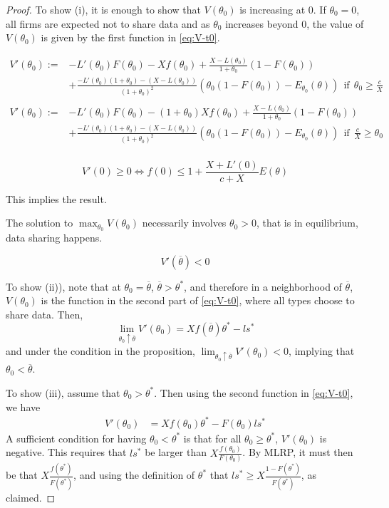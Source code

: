 \documentclass[a4paper]{article}
\renewcommand{\t}{\theta}
\begin{document}
\begin{proof}
  To show (i), it is enough to show that $V(\t_0)$ is increasing at $0$. If $\t_0=0$, all firms are expected not to share data and as $\theta_0$ increases beyond $0$, the value of $V(\t_0)$ is given by the first function in \eqref{eq:V-t0}. 
  
  
  \begin{equation}\label{eq:V-t0}
\begin{aligned}
  V'(\t_0):=&-L'(\t_0)F(\t_0)-X f(\t_0)+\frac{X-L(\t_0)}{1+\t_0}(1-F(\t_0))\\
  &+\frac{-L'(\t_0)(1+\t_0)-(X-L(\t_0))}{(1+\t_0)^2}(\t_0(1-F(\t_0))-E_{\t_0}(\t))~~\textrm{if}~~ \t_0\geq\frac{c}{X}\\
  \\
  V'(\t_0):=&-L'(\t_0)F(\t_0)-(1+\t_0)X f(\t_0)+\frac{X-L(\t_0)}{1+\t_0}(1-F(\t_0))\\
  &+\frac{-L'(\t_0)(1+\t_0)-(X-L(\t_0))}{(1+\t_0)^2}(\t_0(1-F(\t_0))-E_{\t_0}(\t))~~\textrm{if}~~\frac{c}{X} \geq\t_0\\
\end{aligned}
  \end{equation}


$$V'(0)\geq 0 \iff f(0)\leq 1+\frac{X+L'(0)}{c+X}E(\t)$$

This implies the result.

%
The solution to $\max_{\t_0} V(\t_0)$ necessarily involves $\t_0>0$, that is in equilibrium, data sharing happens.

$$V'(\overline \t)<0$$


  To show (ii)), note that at $\t_0=\overline \t$, $\overline \t>\t^*$, and therefore in a neighborhood of $\overline \t$, $V(\t_0)$ is the function in the second part of \eqref{eq:V-t0}, where all types choose to share data. Then, 
  \[
    \lim_{\t_0\uparrow \overline \t}V'(\t_0)=Xf(\overline \t)\t^*- ls^*
 \]
and under the condition in the proposition, $\lim_{\t_0\uparrow \overline \t}V'(\t_0)<0$, implying that $\t_0<\overline \t$.

To show (iii), assume that $\t_0>\t^*$. Then using the second function in \eqref{eq:V-t0}, we have
\begin{align*}
  V'(\t_0)&=Xf(\t_0)\t^*-F(\t_0)l s^*
\end{align*}
A sufficient condition for having $\t_0<\t^*$ is that for all $\t_0\geq \t^*$, $V'(\t_0)$ is negative. This requires that $ls^*$ be larger than $X\frac{f(\t_0)}{F(\t_0)}$. By MLRP, it must then be that  $X\frac{f(\t^*)}{F(\t^*)}$, and using the definition of $\t^*$ that $ls^*\geq X\frac{1-F(\t^*)}{F(\t^*)}$, as claimed.
\end{proof}
\end{document}
